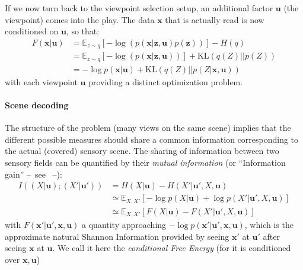 \documentclass[12pt,twoside,openright]{article}
\begin{document}
 
 
If we now turn back to the viewpoint selection setup, an additional factor $\boldsymbol{u}$ (the viewpoint) comes into the play. The data $\boldsymbol{x}$ that is actually read is now conditioned on  $\boldsymbol{u}$, so that:
\begin{align}
F(\boldsymbol{x}|\boldsymbol{u}) 
&= \mathbb{E}_{z\sim q} \left[-\log (p(\boldsymbol{x}|\boldsymbol{z},\boldsymbol{u})p(\boldsymbol{z}))\right] - H(q)\\
&= \mathbb{E}_{z\sim q} \left[-\log (p(\boldsymbol{x}|\boldsymbol{z},\boldsymbol{u}))\right] +\text{KL}(q(Z)||p(Z))
\label{eq:FEP-prior-u}\\
&= - \log p(\boldsymbol{x}|\boldsymbol{u}) + \text{KL}(q(Z)||p(Z|\boldsymbol{x}, \boldsymbol{u}))
\label{eq:FEP-posterior-u}\end{align}
with each viewpoint $\boldsymbol{u}$ providing a distinct optimization problem. 
 
\paragraph{Scene decoding}
The structure of the problem (many views on the same scene) implies that the different possible measures should share a common information corresponding to the actual (covered) sensory scene. The sharing of information between two sensory fields can be quantified by their \emph{mutual information} (or ``Information gain'' --~see \cite{tishby2011information}~--):
\begin{align}
I((X| \boldsymbol{u}); (X'| \boldsymbol{u}')) &= H(X| \boldsymbol{u}) - H(X'| \boldsymbol{u}', X, \boldsymbol{u})\\
&\simeq \mathbb{E}_{X,X'} \left[-\log p(X| \boldsymbol{u}) + \log p(X'| \boldsymbol{u}', X, \boldsymbol{u})\right] \nonumber\\
&\simeq \mathbb{E}_{X,X'} \left[F(X|\boldsymbol{u}) - F(X'|\boldsymbol{u}', X, \boldsymbol{u})\right] \label{eq:infomax}
\end{align}
with $F(\boldsymbol{x}'|\boldsymbol{u}', \boldsymbol{x}, \boldsymbol{u})$ a quantity approaching  $-\log p(\boldsymbol{x}'| \boldsymbol{u}', \boldsymbol{x}, \boldsymbol{u})$, which is the approximate natural Shannon Information provided by seeing $\boldsymbol{x}'$ at $\boldsymbol{u}'$ after seeing $\boldsymbol{x}$ at $\boldsymbol{u}$. We call it here the \emph{conditional Free Energy} (for it is conditioned over $\boldsymbol{x}, \boldsymbol{u}$)
\end{document}
